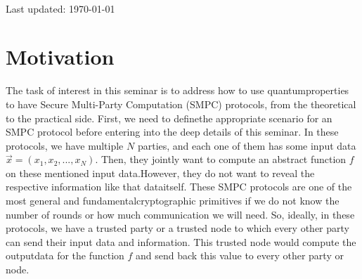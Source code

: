 \documentclass[12pt]{article}
\begin{document}
\begin{titlepage}
\begin{minipage}{0.75\textwidth}
    \end{minipage}\\[2cm]
    \vspace{-1cm}    
    
    
    {\large{Last updated: \today}}\\[2cm] %
    
    \vfill %

    \end{titlepage}

    \clearpage

    \section{Motivation}
    \label{sec:motivation}

    The task of interest in this seminar is to address how to use quantum\break properties to have Secure Multi-Party Computation (SMPC) protocols\break \cite{shamir-rivest-adleman:mental-poker:1981:03-2024,yao:protocols-secure-computations:1982:03-2024,yao:how-generate-and-exchange-secrets:1986:03-2024,goldreich-micali-wigderson:how-play-any-mental-game-completeness-theorem-protocols-honest-majority:1987:03-2024,ben-or-goldwasser-wigderson:completeness-theorems-non-cryptographic-fault-tolerant-distributed-computation:1988:03-2024,chaum-crepeau-damgard:multiparty-unconditionally-secure-protocols:1988:03-2024}, from the theoretical to the practical side. First, we need to define\break the appropriate scenario for an SMPC protocol before entering into the deep details of this seminar. In these protocols, we have multiple $N$ parties, and each one of them has some input data $\vec{x} = ({x}_{1}, {x}_{2}, ..., {x}_{N})$. Then, they jointly want to compute an abstract function $f$ on these mentioned input data.\break However, they do not want to reveal the respective information like that data\break itself. These SMPC protocols are one of the most general and fundamental\break cryptographic primitives if we do not know the number of rounds or how much communication we will need. So, ideally, in these protocols, we have a trusted party or a trusted node to which every other party can send their input data and information. This trusted node would compute the output\break data for the function $f$ and send back this value to every other party or node. 
\end{document}
